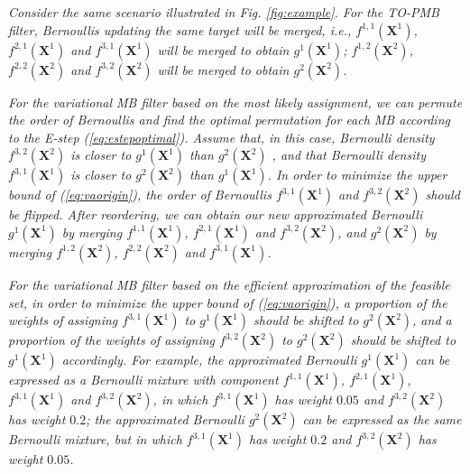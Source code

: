 \documentclass[journal]{IEEEtran}
\begin{document}
\begin{example}
\emph{Consider the same scenario illustrated in Fig. \ref{fig:example}. For the TO-PMB filter, Bernoullis updating the same target will be merged, i.e., $f^{1,1}(\mathbf{X}^1)$, $f^{2,1}(\mathbf{X}^1)$ and $f^{3,1}(\mathbf{X}^1)$ will be merged to obtain $g^1(\mathbf{X}^1)$; $f^{1,2}(\mathbf{X}^2)$, $f^{2,2}(\mathbf{X}^2)$ and $f^{3,2}(\mathbf{X}^2)$ will be merged to obtain $g^2(\mathbf{X}^2)$.}

\emph{For the variational MB filter based on the most likely assignment, we can permute the order of Bernoullis and find the optimal permutation for each MB according to the E-step (\ref{eq:estepoptimal}). Assume that, in this case, Bernoulli density $f^{3,2}(\mathbf{X}^2)$ is closer to $g^1(\mathbf{X}^1)$ than $g^2(\mathbf{X}^2)$ , and that Bernoulli density $f^{3,1}(\mathbf{X}^1)$ is closer to $g^2(\mathbf{X}^2)$ than $g^1(\mathbf{X}^1)$. In order to minimize the upper bound of (\ref{eq:vaorigin}), the order of Bernoullis $f^{3,1}(\mathbf{X}^1)$ and $f^{3,2}(\mathbf{X}^2)$ should be flipped. After reordering, we can obtain our new approximated Bernoulli $g^1(\mathbf{X}^1)$ by merging $f^{1,1}(\mathbf{X}^1)$, $f^{2,1}(\mathbf{X}^1)$ and $f^{3,2}(\mathbf{X}^2)$, and $g^2(\mathbf{X}^2)$ by merging $f^{1,2}(\mathbf{X}^2)$, $f^{2,2}(\mathbf{X}^2)$ and $f^{3,1}(\mathbf{X}^1)$.}

\emph{For the variational MB filter based on the efficient approximation of the feasible set, in order to minimize the upper bound of (\ref{eq:vaorigin}), a proportion of the weights of assigning $f^{3,1}(\mathbf{X}^1)$ to $g^1(\mathbf{X}^1)$ should be shifted to $g^2(\mathbf{X}^2)$, and a proportion of the weights of assigning $f^{3,2}(\mathbf{X}^2)$ to $g^2(\mathbf{X}^2)$ should be shifted to $g^1(\mathbf{X}^1)$ accordingly. For example, the approximated Bernoulli $g^1(\mathbf{X}^1)$ can be expressed as a Bernoulli mixture with component $f^{1,1}(\mathbf{X}^1)$, $f^{2,1}(\mathbf{X}^1)$,  $f^{3,1}(\mathbf{X}^1)$ and $f^{3,2}(\mathbf{X}^2)$, in which $f^{3,1}(\mathbf{X}^1)$ has weight $0.05$ and $f^{3,2}(\mathbf{X}^2)$ has weight $0.2$; the approximated Bernoulli $g^2(\mathbf{X}^2)$ can be expressed as the same Bernoulli mixture, but in which $f^{3,1}(\mathbf{X}^1)$ has weight $0.2$ and $f^{3,2}(\mathbf{X}^2)$ has weight $0.05$.}
\\\IEEEQEDopen
\end{example}

\end{document}
